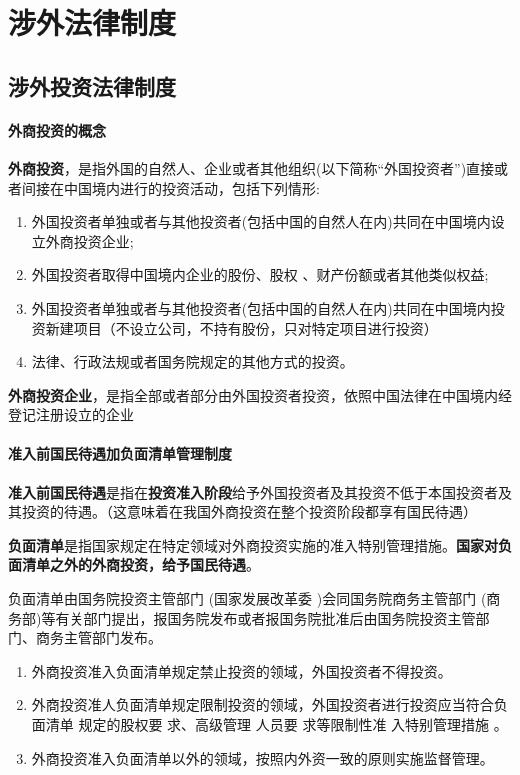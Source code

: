 \documentclass[UTF8,12pt]{ctexart}
\numberwithin{equation}{section} %
\numberwithin{figure}{section}
\numberwithin{table}{section}
\begin{document}
	\newpage
	\section{涉外法律制度}
	
	\subsection{涉外投资法律制度}
	\paragraph{外商投资的概念}
	
	\textbf{外商投资}，是指外国的自然人、企业或者其他组织(以下简称“外国投资者”)直接或者间接在中国境内进行的投资活动，包括下列情形:
	\begin{enumerate}
		\item 外国投资者单独或者与其他投资者(包括中国的自然人在内)共同在中国境内设立外商投资企业;
		
		\item 外国投资者取得中国境内企业的股份、股权 、财产份额或者其他类似权益;
		
		\item 外国投资者单独或者与其他投资者(包括中国的自然人在内)共同在中国境内投资新建项目（不设立公司，不持有股份，只对特定项目进行投资）
		
		\item 法律、行政法规或者国务院规定的其他方式的投资。
	\end{enumerate}

	\textbf{外商投资企业}，是指全部或者部分由外国投资者投资，依照中国法律在中国境内经登记注册设立的企业
	
	\paragraph{准入前国民待遇加负面清单管理制度}
	\textbf{准入前国民待遇}是指在\textbf{投资准入阶段}给予外国投资者及其投资不低于本国投资者及其投资的待遇。（这意味着在我国外商投资在整个投资阶段都享有国民待遇）
	
	 \textbf{负面清单}是指国家规定在特定领域对外商投资实施的准入特别管理措施。\textbf{国家对负面清单之外的外商投资，给予国民待遇}。
	 
	 负面清单由国务院投资主管部门 (国家发展改革委 )会同国务院商务主管部门 (商务部)等有关部门提出，报国务院发布或者报国务院批准后由国务院投资主管部门、商务主管部门发布。
	 \begin{enumerate}
	 	\item 外商投资准入负面清单规定禁止投资的领域，外国投资者不得投资。
	 	
	 	\item 外商投资准人负面清单规定限制投资的领域，外国投资者进行投资应当符合负面清单 规定的股权要 求、高级管理 人员要 求等限制性准 入特别管理措施 。
	 	
	 	\item 外商投资准入负面清单以外的领域，按照内外资一致的原则实施监督管理。
	 \end{enumerate}
	
\end{document}
